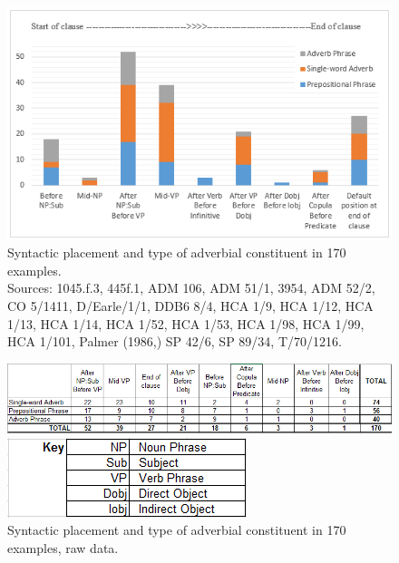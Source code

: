 \begin{figure}
\includegraphics[width=\textwidth]{figures/delgado-img17.png}
\caption{\label{fig:key:7.1} Syntactic placement and type of adverbial constituent in 170 examples.\\
Sources: 1045.f.3, 445f.1, \citet{AdkinsAdkins2008} ADM 106, ADM 51/1, 3954, ADM 52/2, \citet{Brown2011}   CO 5/1411, D/Earle/1/1, DDB6 8/4, HCA 1/9, HCA 1/12, HCA 1/13, HCA 1/14, HCA 1/52, HCA 1/53, HCA 1/98, HCA 1/99, HCA 1/101, Palmer (1986,) SP 42/6, SP 89/34, T/70/1216.}
\end{figure}

  
\begin{figure}  
\includegraphics[width=\textwidth]{figures/delgado-img18.png}
 
\includegraphics[width=\textwidth]{figures/delgado-img19.png}
\caption{\label{tab:key:7.1} Syntactic placement and type of adverbial constituent in 170 examples, raw data.}
\end{figure}


